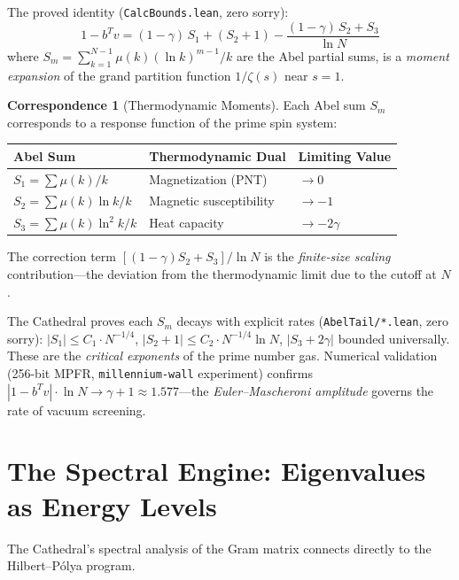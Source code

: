 \documentclass[11pt,a4paper]{article}
\theoremstyle{definition}
\newtheorem{correspondence}[definition]{Correspondence}
\newcommand{\lean}[1]{\texttt{#1}}
\begin{document}
The proved identity (\lean{CalcBounds.lean}, zero sorry):
\[
  1 - b^T v
  = (1 - \gamma)\, S_1 + (S_2 + 1)
  - \frac{(1 - \gamma)\,S_2 + S_3}{\ln N}
\]
where $S_m = \sum_{k=1}^{N-1} \mu(k)(\ln k)^{m-1}/k$ are the Abel
partial sums, is a \emph{moment expansion} of the grand partition function
$1/\zeta(s)$ near $s = 1$.

\begin{correspondence}[Thermodynamic Moments]
  Each Abel sum $S_m$ corresponds to a response function of the prime
  spin system:
  \begin{center}
  \begin{tabular}{@{}lll@{}}
  \toprule
  \textbf{Abel Sum} & \textbf{Thermodynamic Dual} & \textbf{Limiting Value} \\
  \midrule
  $S_1 = \sum \mu(k)/k$ & Magnetization (PNT) & $\to 0$ \\
  $S_2 = \sum \mu(k)\ln k / k$ & Magnetic susceptibility & $\to -1$ \\
  $S_3 = \sum \mu(k)\ln^2 k / k$ & Heat capacity & $\to -2\gamma$ \\
  \bottomrule
  \end{tabular}
  \end{center}
  The correction term $[(1-\gamma)S_2 + S_3]/\ln N$ is the
  \emph{finite-size scaling} contribution---the deviation from the
  thermodynamic limit due to the cutoff at $N$.
\end{correspondence}

The Cathedral proves each $S_m$ decays with explicit rates
(\lean{AbelTail/*.lean}, zero sorry):
$|S_1| \leq C_1 \cdot N^{-1/4}$,
$|S_2 + 1| \leq C_2 \cdot N^{-1/4} \ln N$,
$|S_3 + 2\gamma|$ bounded universally.
These are the \emph{critical exponents} of the prime number gas.
Numerical validation (256-bit MPFR, \texttt{millennium-wall} experiment)
confirms $|1 - b^T v| \cdot \ln N \to \gamma + 1 \approx 1.577$---the
\emph{Euler--Mascheroni amplitude} governs the rate of vacuum screening.

\section{The Spectral Engine: Eigenvalues as Energy Levels}
\label{sec:spectral}

The Cathedral's spectral analysis of the Gram matrix connects directly
to the Hilbert--P\'olya program.
\end{document}
